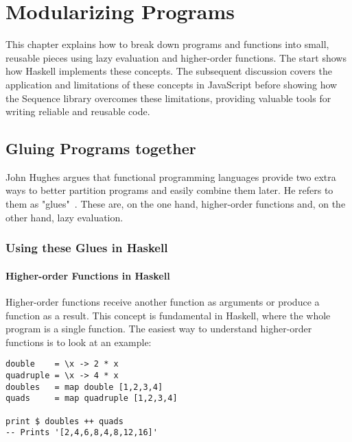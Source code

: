 \chapter{Modularizing Programs} %
\label{chap:Modularizing Programs}
This chapter explains how to break down programs and functions into small,
reusable pieces using lazy evaluation and higher-order functions. The start
shows how Haskell implements these concepts. The subsequent discussion covers
the application and limitations of these concepts in JavaScript before showing
how the Sequence library overcomes these limitations, providing valuable tools
for writing reliable and reusable code.

\section{Gluing Programs together} %
\label{sec:Gluing Programs together}
John Hughes argues that functional programming languages provide two extra ways
to better partition programs and easily combine them later. He refers to them
as "glues"~\cite[p.3]{hughes_why_1989}. These are, on the one hand,
higher-order functions and, on the other hand, lazy evaluation.

\subsection{Using these Glues in Haskell} %
\label{sub:Using these Glues in Haskel}

\subsubsection{Higher-order Functions in Haskell} %
\label{subsub:Higher-order functions Haskell}
Higher-order functions receive another function as arguments or produce a
function as a result. This concept is fundamental in Haskell, where the whole
program is a single function. The easiest way to understand higher-order
functions is to look at an example:

\begin{lstlisting}[style=Haskell, 
                  caption=Higher-order functions in Haskell, 
                  label={lst:hof_haskell}
]
double    = \x -> 2 * x
quadruple = \x -> 4 * x
doubles   = map double [1,2,3,4]
quads     = map quadruple [1,2,3,4]

print $ doubles ++ quads
-- Prints '[2,4,6,8,4,8,12,16]'
\end{lstlisting}

